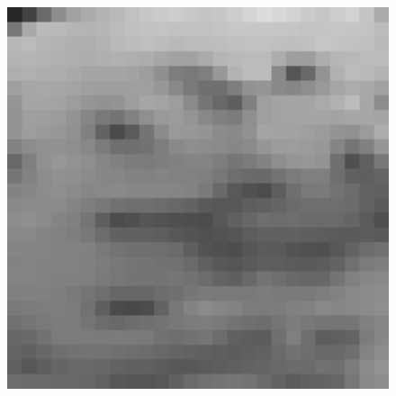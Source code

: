 \documentclass[review,numbers,sort&compress]{elsarticle}  %
\begin{document}
\begin{figure}[htbp]
{\begin{minipage}[b]{0.17\textwidth}
                \includegraphics[width=1\textwidth]{compareImage/FIRF_flowers_mag_2.png}
            \end{minipage}
        }
\end{figure}
\end{document}
